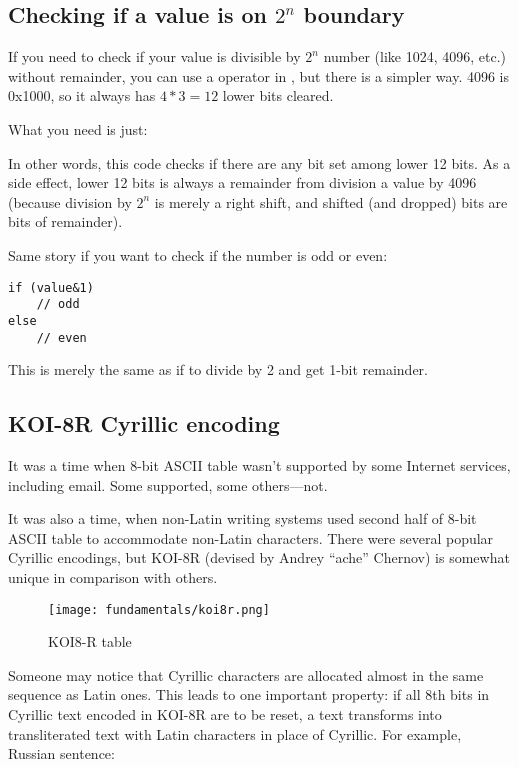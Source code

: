 
\subsection{Checking if a value is on $2^n$ boundary}

If you need to check if your value is divisible by $2^n$ number (like 1024, 4096, etc.) without remainder,
you can use a \TT{\%} operator in \CCpp, but there is a simpler way.
4096 is 0x1000, so it always has $4*3=12$ lower bits cleared.

What you need is just:



In other words, this code checks if there are any bit set among lower 12 bits.
As a side effect, lower 12 bits is always a remainder from division a value by 4096 (because division by $2^n$
is merely a right shift, and shifted (and dropped) bits are bits of remainder).

Same story if you want to check if the number is odd or even:

\begin{lstlisting}[style=customc]
if (value&1)
	// odd
else
	// even
\end{lstlisting}

This is merely the same as if to divide by 2 and get 1-bit remainder.

\subsection{KOI-8R Cyrillic encoding}

It was a time when 8-bit \ac{ASCII} table wasn't supported by some Internet services, including email.
Some supported, some others---not.

It was also a time, when non-Latin writing systems used second half of 8-bit ASCII table to accommodate non-Latin characters.
There were several popular Cyrillic encodings, but KOI-8R (devised by Andrey ``ache'' Chernov)
is somewhat unique in comparison with others.

\begin{figure}[H]
\centering
\texttt{[image: fundamentals/koi8r.png]}
\caption{KOI8-R table}
\end{figure}

Someone may notice that Cyrillic characters are allocated almost in the same sequence as Latin ones.
This leads to one important property: if all 8th bits in Cyrillic text encoded in KOI-8R are to be reset,
a text transforms into transliterated text with Latin characters in place of Cyrillic.
For example, Russian sentence:

